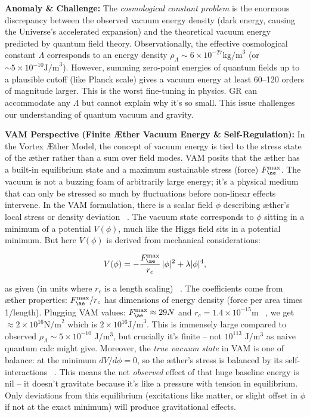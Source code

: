 \documentclass[a4paper, aps,preprint,superscriptaddress, 12pt]{revtex4}
\begin{document}
\textbf{Anomaly \& Challenge: } The \textit{cosmological constant problem} is the enormous discrepancy between the observed vacuum energy density (dark energy, causing the Universe’s accelerated expansion) and the theoretical vacuum energy predicted by quantum field theory. Observationally, the effective cosmological constant $\Lambda$ corresponds to an energy density $\rho_{\Lambda}\sim 6\times10^{-27}\text{kg/m}^3$ (or $\sim 5\times10^{-10}\text{J/m}^3$). However, summing zero-point energies of quantum fields up to a plausible cutoff (like Planck scale) gives a vacuum energy at least 60–120 orders of magnitude larger. This is the worst fine-tuning in physics. GR can accommodate any $\Lambda$ but cannot explain why it’s so small. This issue challenges our understanding of quantum vacuum and gravity.


\textbf{VAM Perspective (Finite Æther Vacuum Energy \& Self-Regulation):} In the Vortex Æther Model, the concept of vacuum energy is tied to the stress state of the æther rather than a sum over field modes. VAM posits that the æther has a built-in equilibrium state and a maximum sustainable stress (force) $F_{\ae}^{\max}$. The vacuum is not a buzzing foam of arbitrarily large energy; it’s a physical medium that can only be stressed so much by fluctuations before non-linear effects intervene. In the VAM formulation, there is a scalar field $\phi$ describing æther’s local stress or density deviation~\cite{Iskandarani2025c} . The vacuum state corresponds to $\phi$ sitting in a minimum of a potential $V(\phi)$, much like the Higgs field sits in a potential minimum. But here $V(\phi)$ is derived from mechanical considerations:

\begin{equation}
    V(\phi) = -\frac{F_{\ae}^{\max}}{r_c}\,|\phi|^2 + \lambda |\phi|^4,
\end{equation}

as given (in units where $r_c$ is a length scaling)~\cite{Iskandarani2025c} . The coefficients come from æther properties: $F_{\ae}^{\max}/r_c$ has dimensions of energy density (force per area times 1/length). Plugging VAM values: $F_{\ae}^{\max}\approx 29N$ and $r_c=1.4\times10^{-15}\text{m}$~\cite{VAM_constants} , we get $\approx 2\times10^{16}\text{N/m}^2$ which is $2\times10^{16}\text{J/m}^3$. This is immensely large compared to observed $\rho_\Lambda\sim5\times10^{-10}$ J/m$^3$, but crucially it’s finite – not $10^{113}$ J/m$^3$ as naive quantum calc might give. Moreover, the \textit{true vacuum state} in VAM is one of balance: at the minimum $dV/d\phi=0$, so the æther’s stress is balanced by its self-interactions~\cite{Iskandarani2025c} . This means the net \textit{observed} effect of that huge baseline energy is nil – it doesn’t gravitate because it’s like a pressure with tension in equilibrium. Only deviations from this equilibrium (excitations like matter, or slight offset in $\phi$ if not at the exact minimum) will produce gravitational effects.
\end{document}
